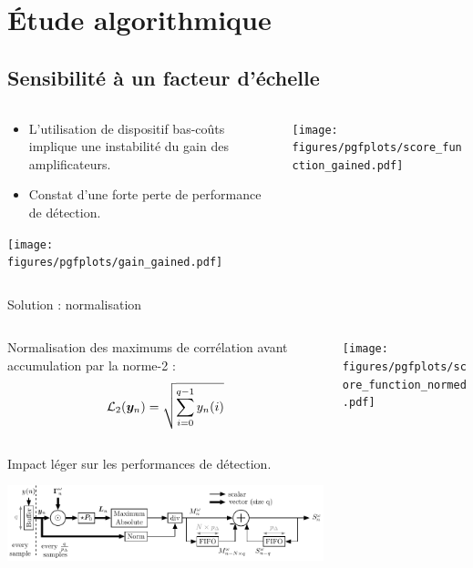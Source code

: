 \documentclass[../main.tex]{subfiles}
\begin{document}
\section{Étude algorithmique}

\subsection{Sensibilité à un facteur d'échelle}

\begin{frame}{\subsecname}
  \begin{columns}
    \begin{column}{.5\linewidth}
      \centering
      \begin{itemize}
        \item L'utilisation de dispositif bas-coûts implique une instabilité du gain des amplificateurs.
        \item Constat d'une forte perte de performance de détection.
      \end{itemize} \vspace*{1 em}

      \texttt{[image: figures/pgfplots/gain\_gained.pdf]}
    \end{column}
    \begin{column}{.5\linewidth}
      \texttt{[image: figures/pgfplots/score\_function\_gained.pdf]}
    \end{column}
  \end{columns}
\end{frame}

\begin{frame}{Solution : normalisation}
  \begin{columns}
    \begin{column}{.5\linewidth}
      \centering
      Normalisation des maximums de corrélation avant accumulation par la norme-2 : $$\mathcal{L}_{2}(\bm{y}_n) = \sqrt{\sum_{i = 0}^{q - 1} y_n(i)}$$\\
      Impact léger sur les performances de détection\footnotemark.
      
      \vspace*{1 em}

      \includegraphics[width=\linewidth]{figures/tikzpicture/score_proc_unit_stdl.pdf}
    \end{column}
    \begin{column}{.5\linewidth}
      \texttt{[image: figures/pgfplots/score\_function\_normed.pdf]}
    \end{column}
  \end{columns}
\end{frame}
\end{document}
